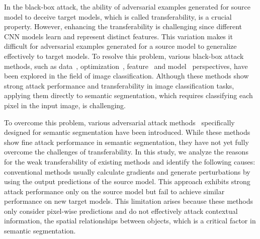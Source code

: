 In the black-box attack, the ability of adversarial examples generated for source model to deceive target models, which is called transferability, is a crucial property. However, enhancing the transferability is challenging since different CNN models learn and represent distinct features. This variation makes it difficult for adversarial examples generated for a source model to generalize effectively to target models. To resolve this problem, various black-box attack methods, such as data~\cite{mkadry2017towards, dong2019evading, lin2019nesterov, xie2019improving, wang2021admix}, optimization~\cite{dong2018boosting, lin2019nesterov, guo2020backpropagating, long2024convergence}, feature~\cite{huang2019enhancing, wang2021feature, zhang2022improving, li2024improving, weng2023boosting} and model~\cite{zhu2021rethinking, li2023making, gubri2022lgv, zhu2022toward} perspectives, have been explored in the field of image classification. Although these methods show strong attack performance and transferability in image classification tasks, applying them directly to semantic segmentation, which requires classifying each pixel in the input image, is challenging.

To overcome this problem, various adversarial attack methods~\cite{gu2022segpgd, jia2023transegpgd, xie2017adversarial, agnihotri2024cospgd, chen2023rethinking, chen2023adaptive, jiao2023pearl} specifically designed for semantic segmentation have been introduced. While these methods show fine attack performance in semantic segmentation, they have not yet fully overcome the challenges of transferability. In this study, we analyze the reasons for the weak transferability of existing methods and identify the following causes: conventional methods usually calculate gradients and generate perturbations by using the output predictions of the source model. This approach exhibits strong attack performance only on the source model but fail to achieve similar performance on new target models. This limitation arises because these methods only consider pixel-wise predictions and do not effectively attack contextual information, \ie the spatial relationships between objects, which is a critical factor in semantic segmentation.

